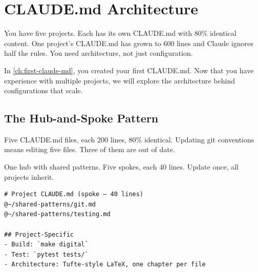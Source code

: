 \chapter{CLAUDE.md Architecture}
\label{ch:architecture}

\begin{itshape}
You have five projects. Each has its own CLAUDE.md with 80\% identical content.
One project's CLAUDE.md has grown to 600 lines and Claude ignores half the rules.
You need architecture, not just configuration.
\end{itshape}

In \cref{ch:first-claude-md}, you created your first CLAUDE.md.
Now that you have experience with multiple projects, we will explore
the architecture behind configurations that scale.

\section{The Hub-and-Spoke Pattern}
\label{sec:hub-and-spoke}


\begin{fullwidth}
\begin{beforeafter}
\before
Five CLAUDE.md files, each 200 lines, 80\% identical.
Updating git conventions means editing five files.
Three of them are out of date.

\after
One hub with shared patterns. Five spokes, each 40 lines.
Update once, all projects inherit.

\begin{verbatim}
# Project CLAUDE.md (spoke — 40 lines)
@~/shared-patterns/git.md
@~/shared-patterns/testing.md

## Project-Specific
- Build: `make digital`
- Test: `pytest tests/`
- Architecture: Tufte-style LaTeX, one chapter per file
\end{verbatim}
\end{beforeafter}
\end{fullwidth}


